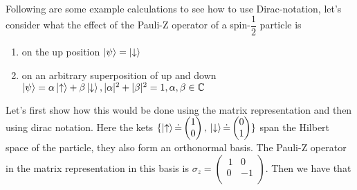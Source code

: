 \\
Following are some example calculations to see how to use Dirac-notation, let's consider what the effect of the Pauli-Z operator of a spin-$\dfrac{1}{2}$ particle is
\begin{enumerate}[label=\textbf{\alph*)}]
\item on the up position $\ket{\psi} = \ket{\downarrow}$

\item on an arbitrary superposition of up and down $\ket{\psi} = \alpha \ket{\uparrow} + \beta\ket{\downarrow}, |\alpha|^2 + |\beta|^2 = 1, \alpha,\beta \in \mathbb{C}$
\end{enumerate}
Let's first show how this would be done using the matrix representation and then using dirac notation.
Here the kets $\{\ket{\uparrow} \dot{=} \begin{pmatrix}
1 \\ 0
\end{pmatrix}, \, \ket{\downarrow} \dot{=} \begin{pmatrix}
0 \\ 1
\end{pmatrix} \}$ span the Hilbert space of the particle, they also form an orthonormal basis. The Pauli-Z operator in the matrix representation in this basis is $\sigma_z = \begin{pmatrix}
\,1 & 0 \\
0 & -1 \\
\end{pmatrix}$. Then we have that 

